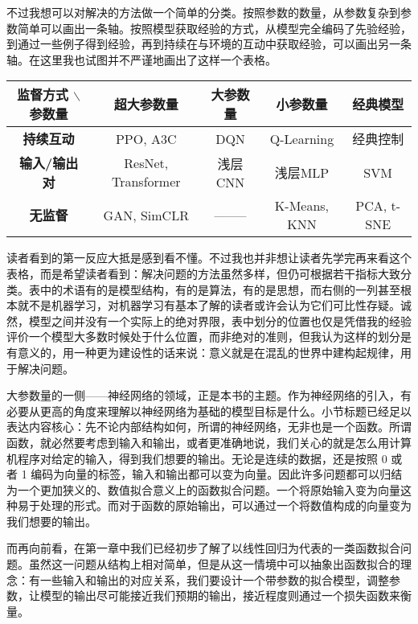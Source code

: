 不过我想可以对解决的方法做一个简单的分类。按照参数的数量，从参数复杂到参数简单可以画出一条轴。按照模型获取经验的方式，从模型完全编码了先验经验，到通过一些例子得到经验，再到持续在与环境的互动中获取经验，可以画出另一条轴。在这里我也试图并不严谨地画出了这样一个表格。
\begin{table}[H]
\centering
\begin{tabular}{c|cccc}
\toprule
\textbf{监督方式 $\backslash$ 参数量} & \textbf{超大参数量} & \textbf{大参数量} & \textbf{小参数量} & \textbf{经典模型} \\
\midrule
\textbf{持续互动} & PPO, A3C & DQN & Q-Learning & 经典控制\\
\textbf{输入/输出对} & ResNet, Transformer & 浅层CNN & 浅层MLP & SVM \\
\textbf{无监督} & GAN, SimCLR & -------- & K-Means, KNN & PCA, t-SNE \\
\bottomrule
\end{tabular}
\end{table}
读者看到的第一反应大抵是感到看不懂。不过我也并非想让读者先学完再来看这个表格，而是希望读者看到：解决问题的方法虽然多样，但仍可根据若干指标大致分类。表中的术语有的是模型结构，有的是算法，有的是思想，而右侧的一列甚至根本就不是机器学习，对机器学习有基本了解的读者或许会认为它们可比性存疑。诚然，模型之间并没有一个实际上的绝对界限，表中划分的位置也仅是凭借我的经验评价一个模型大多数时候处于什么位置，而非绝对的准则，但我认为这样的划分是有意义的，用一种更为建设性的话来说：意义就是在混乱的世界中建构起规律，用于解决问题。

大参数量的一侧——神经网络的领域，正是本书的主题。作为神经网络的引入，有必要从更高的角度来理解以神经网络为基础的模型目标是什么。小节标题已经足以表达内容核心：先不论内部结构如何，所谓的神经网络，无非也是一个函数。所谓函数，就必然要考虑到输入和输出，或者更准确地说，我们关心的就是怎么用计算机程序对给定的输入，得到我们想要的输出。无论是连续的数据，还是按照 0 或者 1 编码为向量的标签，输入和输出都可以变为向量。因此许多问题都可以归结为一个更加狭义的、数值拟合意义上的函数拟合问题。一个将原始输入变为向量这种易于处理的形式。而对于函数的原始输出，可以通过一个将数值构成的向量变为我们想要的输出。

而再向前看，在第一章中我们已经初步了解了以线性回归为代表的一类函数拟合问题。虽然这一问题从结构上相对简单，但是从这一情境中可以抽象出函数拟合的理念：有一些输入和输出的对应关系，我们要设计一个带参数的拟合模型，调整参数，让模型的输出尽可能接近我们预期的输出，接近程度则通过一个损失函数来衡量。

